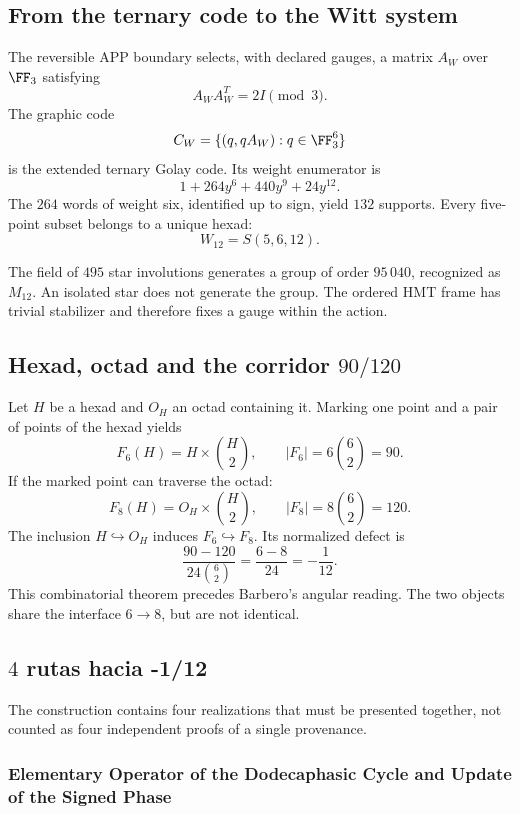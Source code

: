 \subsection{From the ternary code to the Witt system}

The reversible APP boundary selects, with declared gauges, a matrix
\(A_W\) over \(\FF_3\) satisfying
\[
A_WA_W^T=2I\pmod3.
\]
The graphic code
\[
C_W=\{(q,qA_W):q\in\FF_3^6\}
\]
is the extended ternary Golay code. Its weight enumerator is
\[
1+264y^6+440y^9+24y^{12}.
\]
The \(264\) words of weight six, identified up to sign, yield \(132\)
supports. Every five-point subset belongs to a unique hexad:
\[
W_{12}=S(5,6,12).
\]

The field of \(495\) star involutions generates a group of order
\(95\,040\), recognized as \(M_{12}\). An isolated star does not generate the
group. The ordered HMT frame has trivial stabilizer and therefore fixes a
gauge within the action.

\subsection{Hexad, octad and the corridor \texorpdfstring{\(90/120\)}{90/120}}

Let \(H\) be a hexad and \(O_H\) an octad containing it. Marking one point
and a pair of points of the hexad yields
\[
F_6(H)=H\times\binom H2,
\qquad
|F_6|=6\binom62=90.
\]
If the marked point can traverse the octad:
\[
F_8(H)=O_H\times\binom H2,
\qquad
|F_8|=8\binom62=120.
\]
The inclusion \(H\hookrightarrow O_H\) induces \(F_6\hookrightarrow F_8\).
Its normalized defect is
\[
\boxed{
\frac{90-120}{24\binom62}
=\frac{6-8}{24}
=-\frac1{12}.}
\]
This combinatorial theorem precedes Barbero’s angular reading. The
two objects share the interface \(6\to8\), but are not identical.

\subsection{\(4\) rutas hacia -1/12}

The construction contains four realizations that must be presented together, not
counted as four independent proofs of a single provenance.

\subsubsection{Elementary Operator of the Dodecaphasic Cycle and Update of the Signed Phase}

